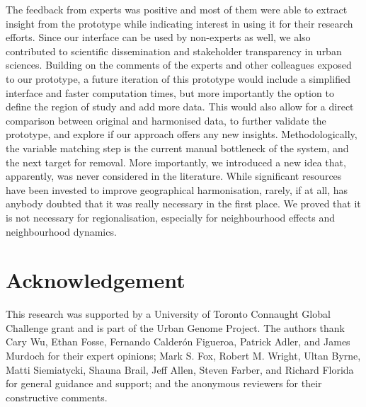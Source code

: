 \documentclass[10pt,letterpaper]{article}
\begin{document}
The feedback from experts was positive and most of them were able to extract
insight from the prototype while indicating interest in using it for their
research efforts.  Since our interface can be used by non-experts as well, we
also contributed to scientific dissemination and stakeholder transparency in
urban sciences. Building on the comments of the experts and other colleagues
exposed to our prototype, a future iteration of this prototype would include a
simplified interface and faster computation times, but more importantly the
option to define the region of study and add more data. This would also allow
for a direct comparison between original and harmonised data, to further
validate the prototype, and explore if our approach offers any new insights.
Methodologically, the variable matching step is the current manual bottleneck of
the system, and the next target for removal. More importantly, we introduced a
new idea that, apparently, was never considered in the literature. While
significant resources have been invested to improve geographical harmonisation,
rarely, if at all, has anybody doubted that it was really necessary in the first
place. We proved that it is not necessary for regionalisation, especially for
neighbourhood effects and neighbourhood dynamics.


\section*{Acknowledgement}
This research was supported by a University of Toronto Connaught Global
Challenge grant and is part of the Urban Genome Project. The authors thank Cary
Wu, Ethan Fosse, Fernando Calderón Figueroa, Patrick Adler, and James Murdoch
for their expert opinions; Mark S. Fox, Robert M. Wright, Ultan Byrne, Matti
Siemiatycki, Shauna Brail, Jeff Allen, Steven Farber, and Richard Florida for
general guidance and support; and the anonymous reviewers for their constructive
comments.



\end{document}
